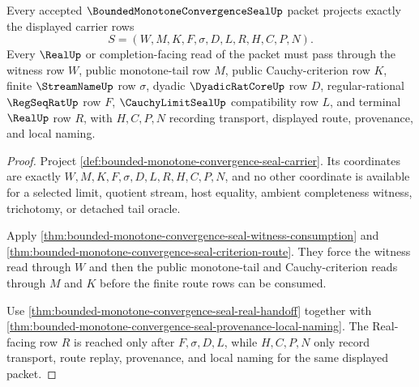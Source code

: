\begin{theorem}
\label{thm:bounded-monotone-convergence-seal-carrier-admission}
Every accepted $\BoundedMonotoneConvergenceSealUp$ packet projects exactly the displayed carrier rows
$$
S=(W,M,K,F,\sigma,D,L,R,H,C,P,N).
$$
Every $\RealUp$ or completion-facing read of the packet must pass through the witness row $W$, public monotone-tail row $M$, public Cauchy-criterion row $K$, finite $\StreamNameUp$ row $\sigma$, dyadic $\DyadicRatCoreUp$ row $D$, regular-rational $\RegSeqRatUp$ row $F$, $\CauchyLimitSealUp$ compatibility row $L$, and terminal $\RealUp$ row $R$, with $H,C,P,N$ recording transport, displayed route, provenance, and local naming.
\end{theorem}
\begin{proof}
Project \autoref{def:bounded-monotone-convergence-seal-carrier}. Its coordinates are exactly $W,M,K,F,\sigma,D,L,R,H,C,P,N$, and no other coordinate is available for a selected limit, quotient stream, host equality, ambient completeness witness, trichotomy, or detached tail oracle.

Apply \autoref{thm:bounded-monotone-convergence-seal-witness-consumption} and \autoref{thm:bounded-monotone-convergence-seal-criterion-route}. They force the witness read through $W$ and then the public monotone-tail and Cauchy-criterion reads through $M$ and $K$ before the finite route rows can be consumed.

Use \autoref{thm:bounded-monotone-convergence-seal-real-handoff} together with \autoref{thm:bounded-monotone-convergence-seal-provenance-local-naming}. The Real-facing row $R$ is reached only after $F,\sigma,D,L$, while $H,C,P,N$ only record transport, route replay, provenance, and local naming for the same displayed packet.
\end{proof}

